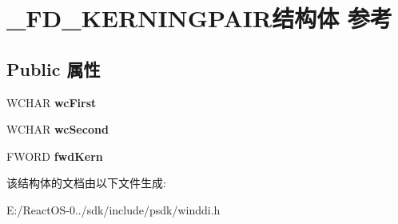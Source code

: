 \hypertarget{struct___f_d___k_e_r_n_i_n_g_p_a_i_r}{}\section{\+\_\+\+F\+D\+\_\+\+K\+E\+R\+N\+I\+N\+G\+P\+A\+I\+R结构体 参考}
\label{struct___f_d___k_e_r_n_i_n_g_p_a_i_r}
\subsection*{Public 属性}
\begin{DoxyCompactItemize}
\item 
\mbox{\label{struct___f_d___k_e_r_n_i_n_g_p_a_i_r_ab095d3e490393c63cfbb7ed980196fda}} 
W\+C\+H\+AR {\bfseries wc\+First}
\item 
\mbox{\label{struct___f_d___k_e_r_n_i_n_g_p_a_i_r_a67aace7782418e520429b1bd397bc859}} 
W\+C\+H\+AR {\bfseries wc\+Second}
\item 
\mbox{\label{struct___f_d___k_e_r_n_i_n_g_p_a_i_r_a9f372bc8b923664b31181cc5809ae998}} 
F\+W\+O\+RD {\bfseries fwd\+Kern}
\end{DoxyCompactItemize}


该结构体的文档由以下文件生成\+:\begin{DoxyCompactItemize}
\item 
E\+:/\+React\+O\+S-\/0../sdk/include/psdk/winddi.\+h\end{DoxyCompactItemize}
